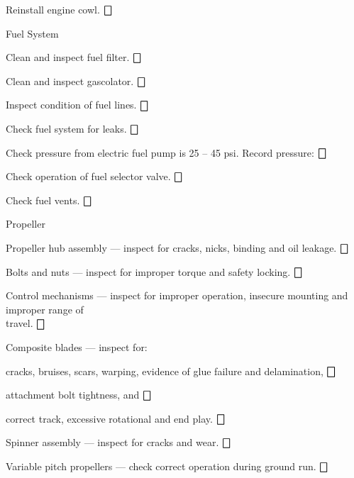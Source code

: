 \begin{enumerate*}
\begin{enumerate*}
		\item Reinstall engine cowl. \dotfill $\bigbox$
	\end{enumerate*}
	\item{Fuel System} 
	\begin{enumerate*}
		\item Clean and inspect fuel filter. \dotfill $\bigbox$
		\item Clean and inspect gascolator. \dotfill $\bigbox$
		\item Inspect condition of fuel lines. \dotfill $\bigbox$
		\item Check fuel system for leaks. \dotfill $\bigbox$
		\item Check pressure from electric fuel pump is 25 -- 45 psi. Record pressure: \underline{\makebox[0.5in][l]{}} \dotfill $\bigbox$
		\item Check operation of fuel selector valve. \dotfill $\bigbox$
		\item Check fuel vents. \dotfill $\bigbox$
	\end{enumerate*}

	\item{Propeller} 
	\begin{enumerate*}
	  \item Propeller hub assembly --- inspect for cracks, nicks, binding and oil leakage. \dotfill $\bigbox$
	  \item Bolts and nuts --- inspect for improper torque and safety locking. \dotfill $\bigbox$
	  \item Control mechanisms --- inspect for improper operation, insecure mounting and improper range of \\travel. \dotfill $\bigbox$
	  \item Composite blades --- inspect for:
	  \begin{enumerate*}
	    \item cracks, bruises, scars, warping, evidence of glue failure and delamination, \dotfill $\bigbox$
	    \item attachment bolt tightness, and \dotfill $\bigbox$
	    \item correct track, excessive rotational and end play. \dotfill $\bigbox$

  	  \end{enumerate*}
  	\item Spinner assembly --- inspect for cracks and wear. \dotfill $\bigbox$
  	\item Variable pitch propellers --- check correct operation during ground run. \dotfill $\bigbox$
	\end{enumerate*}



\end{enumerate*}
